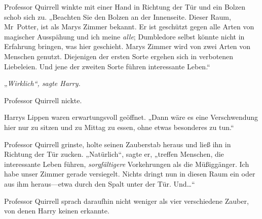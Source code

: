 Professor Quirrell winkte mit einer Hand in Richtung der Tür und ein Bolzen schob sich zu. „Beachten Sie den Bolzen an der Innenseite. Dieser Raum, Mr~Potter, ist als Marys Zimmer bekannt. Er ist geschützt gegen alle Arten von magischer Ausspähung und ich meine \emph{alle}; Dumbledore selbst könnte nicht in Erfahrung bringen, was hier geschieht. Marys Zimmer wird von zwei Arten von Menschen genutzt. Diejenigen der ersten Sorte ergehen sich in verbotenen Liebeleien. Und jene der zweiten Sorte führen interessante Leben.“

„\emph{Wirklich“, sagte Harry.}

Professor Quirrell nickte.

Harrys Lippen waren erwartungsvoll geöffnet. „Dann wäre es eine Verschwendung hier nur zu sitzen und zu Mittag zu essen, ohne etwas besonderes zu tun.“

Professor Quirrell grinste, holte seinen Zauberstab heraus und ließ ihn in Richtung der Tür zucken. „Natürlich“, sagte er, „treffen Menschen, die interessante Leben führen, \emph{sorgfältigere} Vorkehrungen als die Müßiggänger. Ich habe unser Zimmer gerade versiegelt. Nichts dringt nun in diesen Raum ein oder aus ihm heraus—etwa durch den Spalt unter der Tür. Und…“

Professor Quirrell sprach daraufhin nicht weniger als vier verschiedene Zauber, von denen Harry keinen erkannte.

